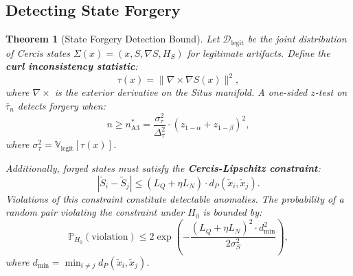 \documentclass[11pt,a4paper]{article}
\theoremstyle{plain}
\newtheorem{theorem}{Theorem}[section]
\theoremstyle{definition}
\theoremstyle{remark}
\newcommand{\bbP}{\mathbb{P}}
\newcommand{\bbV}{\mathbb{V}}
\newcommand{\cD}{\mathcal{D}}
\begin{document}
\subsection{Detecting State Forgery}
\begin{theorem}[State Forgery Detection Bound]\label{thm:a3_detect}
  Let \(\cD_{\text{legit}}\) be the joint distribution of Cercis states
  \(\Sigma(x) = (x, S, \nabla S, H_S)\) for legitimate artifacts. Define the
  \textbf{curl inconsistency statistic}:
  \begin{equation}\label{eq:curl_stat}
    \tau(x) = \|\nabla \times \nabla S(x)\|^2,
  \end{equation}
  where \(\nabla \times\) is the exterior derivative on the Situs manifold.
  A one-sided \(z\)-test on \(\bar{\tau}_n\) detects forgery when:
  \begin{equation}\label{eq:detect_a3_curl}
    n \geq n_{\text{A3}}^* =
    \frac{\sigma_\tau^2}{\Delta_\tau^2} \cdot (z_{1-\alpha} + z_{1-\beta})^2,
  \end{equation}
  where \(\sigma_\tau^2 = \bbV_{\text{legit}}[\tau(x)]\).
  
  Additionally, forged states must satisfy the \textbf{Cercis-Lipschitz constraint}:
  \begin{equation}\label{eq:cercis_lipschitz}
    |\tilde{S}_i - \tilde{S}_j| \leq (L_Q + \eta L_N) \cdot d_P(\tilde{x}_i, \tilde{x}_j).
  \end{equation}
  Violations of this constraint constitute detectable anomalies. The probability of
  a random pair violating the constraint under \(H_0\) is bounded by:
  \[ \bbP_{H_0}(\text{violation}) \leq
    2\exp\left(-\frac{(L_Q + \eta L_N)^2 \cdot d_{\min}^2}{2\sigma_S^2}\right), \]
  where \(d_{\min} = \min_{i \neq j} d_P(\tilde{x}_i, \tilde{x}_j)\).
\end{theorem}
\end{document}
